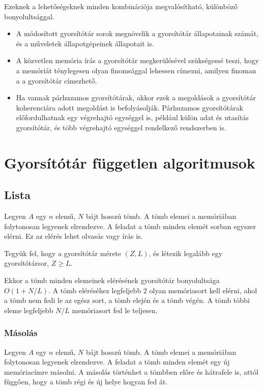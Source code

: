 \documentclass[12pt]{report}
\begin{document}
Ezeknek a lehetőségeknek minden kombinációja megvalósítható, különböző bonyolultsággal.
\begin{itemize}
\item A módosított gyorsítótár sorok megnövelik a gyorsítótár állapotainak számát,
és a műveletek állapotgépeinek állapotait is.
\item A közvetlen memória írás a gyorsítótár megkerülésével szükségessé teszi,
hogy a memóriát ténylegesen olyan finomsággal lehessen címezni,
amilyen finoman a a gyorsítótár címezhető.
\item Ha vannak párhuzamos gyorsítótárak,
akkor ezek a megoldások a gyorsítótár koherenciára adott megoldást is befolyásolják.
Párhuzamos gyorsítótárak előfordulhatnak egy végrehajtó egységgel is,
például külön adat és utasítás gyorsítótár,
és több végrehajtó egységgel rendelkező rendszerben is.
\end{itemize}

\chapter{Gyorsítótár független algoritmusok}

\section{Lista}

Legyen $A$ egy $n$ elemű, $N$ bájt hosszú tömb.
A tömb elemei a memóriában folytonosan legyenek elrendezve.
A feladat a tömb minden elemét sorban egyszer elérni.
Ez az elérés lehet olvasás vagy írás is.

Tegyük fel, hogy a gyorsítótár mérete $(Z, L)$,
és létezik legalább egy gyorsítótársor, $Z \ge L$.

Ekkor a tömb minden elemeinek elérésének gyorsítótár bonyolultsága $O(1+N/L)$.
A tömb eléréséhez legfeljebb $2$ olyan memóriasort kell elérni,
ahol a tömb nem fedi le az egész sort, a tömb elején és a tömb végén.
A tömb többi eleme legfeljebb $N/L$ memóriasort fed le teljesen.

\subsection{Másolás}

Legyen $A$ egy $n$ elemű, $N$ bájt hosszú tömb.
A tömb elemei a memóriában folytonosan legyenek elrendezve.
A feladat a tömb minden elemét egy új memóriacímre másolni.
A másolás történhet a tömbben előre és hátrafele is,
attól függően, hogy a tömb régi és új helye hogyan fed át.
\end{document}
